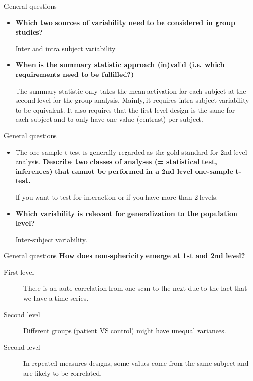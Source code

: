 \documentclass{beamer}
\begin{document}
\begin{frame}{General questions}
  \begin{itemize}
    \item \textbf{Which two sources of variability need to be considered in group studies?}
    
\smallskip   
Inter and intra subject variability

\bigskip
    \item \textbf{When is the summary statistic approach (in)valid (i.e. which requirements need to be fulfilled?)}

\smallskip
The summary statistic only takes the mean activation for each subject at the second level for the group analysis. Mainly, it requires intra-subject variability to be equivalent. \linebreak
It also requires that the first level design is the same for each subject and to only have one value (contrast) per subject.
  \end{itemize}
\end{frame}


\begin{frame}{General questions}
  \begin{itemize}
    \item The one sample t-test is generally regarded as the gold standard for 2nd level analysis. \textbf{Describe two classes of analyses (= statistical test, inferences) that cannot be performed in a 2nd level one-sample t-test.}
    
\smallskip   
If you want to test for interaction or if you have more than 2 levels.

\bigskip 
    \item \textbf{Which variability is relevant for generalization to the population level?}

\smallskip   
Inter-subject variability.
  \end{itemize}
\end{frame}


\begin{frame}{General questions}
\textbf{How does non-sphericity emerge at 1st and 2nd level?}

\smallskip 
    \begin{description}
     \item [First level] There is an auto-correlation from one scan to the next due to the fact that we have a time series.
     \item [Second level] Different groups (patient VS control) might have unequal variances.
     \item [Second level] In repeated measures designs, some values come from the same subject and are likely to be correlated.
    \end{description}    
\end{frame}
\end{document}
